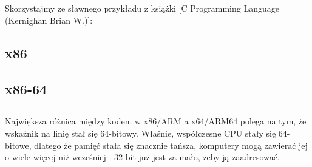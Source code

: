 \section{\HelloWorldSectionName}
\label{sec:helloworld}

Skorzystajmy ze sławnego przykładu z książki [C Programming Language (Kernighan Brian W.)]:



\subsection{x86}





\subsection{x86-64}








\subsection{\Conclusion{}}

Największa różnica między kodem w x86/ARM a x64/ARM64 polega na tym, że wskaźnik na linię stał się 64-bitowy.
Właśnie, współczesne \ac{CPU} stały się 64-bitowe, dlatego że pamięć stała się znacznie tańsza,
komputery mogą zawierać jej o wiele więcej niż wcześniej i 32-bit już jest za mało, żeby ją zaadresować.





